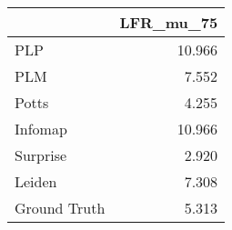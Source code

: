 \begin{tabular}{lr}
\toprule
{} & LFR_mu_75 \\
\midrule
PLP          &    10.966 \\
PLM          &     7.552 \\
Potts        &     4.255 \\
Infomap      &    10.966 \\
Surprise     &     2.920 \\
Leiden       &     7.308 \\
Ground Truth &     5.313 \\
\bottomrule
\end{tabular}
